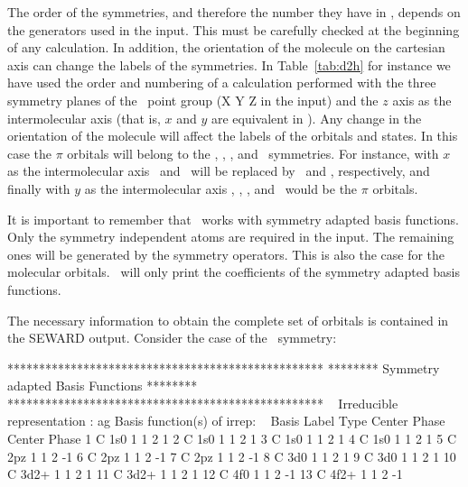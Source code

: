 The order of the symmetries, and therefore the number they have in \molcas, depends
on the generators used in the  input. This must be carefully checked
at the beginning of any calculation. In addition, the orientation of the molecule on the
cartesian axis can change the labels of the symmetries. In Table~\ref{tab:d2h} for
instance we have used the order and numbering of a calculation performed with the
three symmetry planes of the \Dth\ point group (X Y Z in the  input)
and the $z$ axis as the intermolecular axis (that is, $x$ and $y$ are equivalent in \Dth).
Any change in the orientation of the molecule will affect the labels of the orbitals
and states. In this case the $\pi$ orbitals will belong to the \bttu, \btu,
\btg, and \bttg\ symmetries. For instance, with $x$ as the intermolecular axis \bttu\ and \bttg\ will
be replaced by \bou\ and \bog, respectively, and finally with $y$ as the intermolecular axis
\bou, \bttu, \bttg, and \bog\ would be the $\pi$ orbitals.

It is important to remember that \molcas\ works with symmetry adapted basis functions.
Only the symmetry independent atoms are required in the  input. The remaining
ones will be generated by the symmetry operators. This is also the case for the
molecular orbitals. \molcas\ will only print the coefficients of the symmetry adapted
basis functions.

The necessary information to obtain the complete set of orbitals 
is contained in the SEWARD output. Consider the case of the \aog\ symmetry:
\begin{sourcelisting}
                    **************************************************
                    ******** Symmetry adapted Basis Functions ********
                    **************************************************
~
           Irreducible representation : ag
           Basis function(s) of irrep:
~
 Basis Label        Type   Center Phase Center Phase
   1   C            1s0       1     1      2     1
   2   C            1s0       1     1      2     1
   3   C            1s0       1     1      2     1
   4   C            1s0       1     1      2     1
   5   C            2pz       1     1      2    -1
   6   C            2pz       1     1      2    -1
   7   C            2pz       1     1      2    -1
   8   C            3d0       1     1      2     1
   9   C            3d0       1     1      2     1
  10   C            3d2+      1     1      2     1
  11   C            3d2+      1     1      2     1
  12   C            4f0       1     1      2    -1
  13   C            4f2+      1     1      2    -1
\end{sourcelisting}

